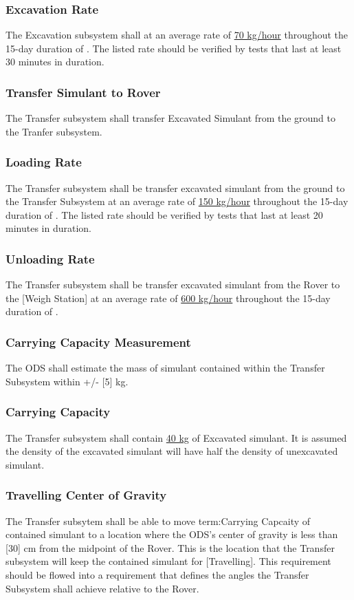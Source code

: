 \subsubsection{Excavation Rate}
\label{ref:Excavation Rate}
The Excavation subsystem shall  at an average rate of \hyperref[term:Excavation Rate]{70 kg/hour} throughout the 15-day duration of . The listed rate should be verified by tests that last at least 30 minutes in duration.  
\subsubsection{Transfer Simulant to Rover}
\label{ref:Transfer Simulant to Rover}
The Transfer subsystem shall transfer Excavated Simulant from the ground to the Tranfer subsystem.  
\subsubsection{Loading Rate}
\label{ref:Loading Rate}
The Transfer subsystem shall be transfer excavated simulant from the ground to the Transfer Subsystem at an average rate of \hyperref[term:Loading Rate]{150 kg/hour} throughout the 15-day duration of . The listed rate should be verified by tests that last at least 20 minutes in duration.  
\subsubsection{Unloading Rate}
\label{ref:Unloading Rate}
The Transfer subsystem shall be transfer excavated simulant from the Rover to the [Weigh Station] at an average rate of \hyperref[term:Unloading Rate]{600 kg/hour} throughout the 15-day duration of . 
\subsubsection{Carrying Capacity Measurement}
\label{ref:Carrying Capacity Measurement}
The ODS shall estimate the mass of simulant contained within the Transfer Subsystem within +/- [5] kg.
\subsubsection{Carrying Capacity}
\label{ref:Carrying Capacity}
The Transfer subsystem shall contain \hyperref[term:Carrying Capacity]{40 kg} of Excavated simulant. It is assumed the density of the excavated simulant will have half the density of unexcavated simulant. 
\subsubsection{Travelling Center of Gravity}
\label{ref:Travelling Center of Gravity}
The Transfer subsytem shall be able to move {term:Carrying Capcaity} of contained simulant to a location where the ODS's center of gravity is less than [30] cm from the midpoint of the Rover. This is the location that the Transfer subsystem will keep the contained simulant for [Travelling]. This requirement should be flowed into a requirement that defines the angles the Transfer Subsystem shall achieve relative to the Rover.
